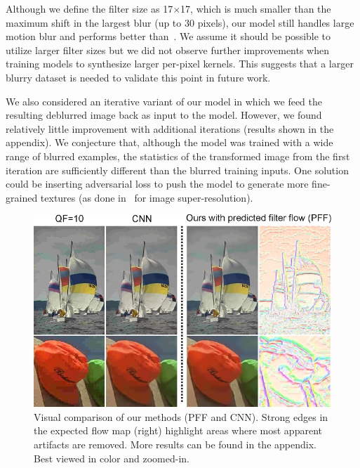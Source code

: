 \documentclass[10pt,twocolumn,letterpaper]{article}
\begin{document}
Although we define the filter size as 17$\times$17, which is much smaller than
the maximum shift in the largest blur (up to 30 pixels), our model still
handles large motion blur and performs better than~\cite{bahat2017non}.  We
assume it should be possible to utilize larger filter sizes but we did not
observe further improvements when training models to synthesize larger
per-pixel kernels. This suggests that a larger blurry dataset is needed to
validate this point in future work.

We also considered an iterative variant of our model in which we feed the
resulting deblurred image back as input to the model.  However, we found
relatively little improvement with additional iterations (results shown in the
appendix). We conjecture that, although the model was trained
with a wide range of blurred examples, the statistics of the transformed image
from the first iteration are sufficiently different than the blurred training
inputs.  One solution could be inserting adversarial loss to push the model to
generate more fine-grained textures (as done in~\cite{ledig2017photo} for image
super-resolution).

\begin{figure}[t]
    \centering
    \begin{minipage}{0.497\textwidth}
        \centering
        \includegraphics[width=1\linewidth]{demo_jpeg.png}
    \end{minipage}
    \vspace{-2mm}
    \caption{Visual comparison of our methods (PFF and CNN). Strong edges
    in the expected flow map (right) highlight areas where most apparent
    artifacts are removed.  More results can be found in the appendix.  
    Best viewed in color and zoomed-in.}
    \label{fig:demo_jpeg}
    \vspace{-1mm}
\end{figure}
\end{document}
